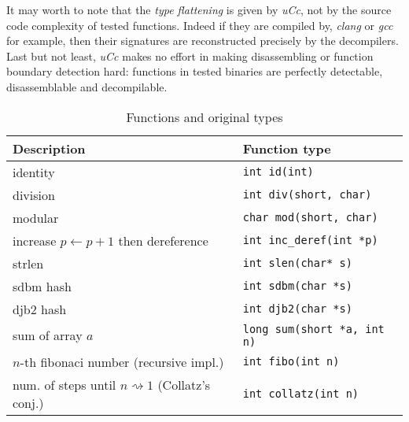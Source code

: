 \documentclass[a4paper]{llncs}
\begin{document}
It may worth to note that the \emph{type flattening} is given by \emph{uCc}, not by the source code
complexity of tested functions. Indeed if they are compiled by, \emph{clang} or \emph{gcc} for example,
then their signatures are reconstructed precisely
by the decompilers. Last but not least, \emph{uCc} makes no effort in making disassembling or function
boundary detection hard: functions in tested binaries are perfectly detectable,
disassemblable and decompilable.

\begin{table}
	\begin{center}
		\caption{Functions and original types}\label{description}
		\begin{tabular}{|l|l|}
			\hline
			Description & Function type \\
			\hline
			identity & \texttt{int id(int)} \\
			\hline
			division & \texttt{int div(short, char)} \\
			\hline
			modular & \texttt{char mod(short, char)} \\
			\hline
			increase $p \leftarrow p + 1$ then dereference & \texttt{int inc\_deref(int *p)} \\
			\hline
			strlen  & \texttt{int slen(char* s)} \\
			\hline
			sdbm hash & \texttt{int sdbm(char *s)} \\
			\hline
			djb2 hash & \texttt{int djb2(char *s)} \\
			\hline
			sum of array $a$ & \texttt{long sum(short *a, int n)} \\
			\hline
			$n$-th fibonaci number (recursive impl.) & \texttt{int fibo(int n)} \\
			\hline
			num. of steps until $n \rightsquigarrow 1$ (Collatz's conj.)  & \texttt{int collatz(int n)} \\
			\hline
		\end{tabular}
	\end{center}
\end{table}
\end{document}
